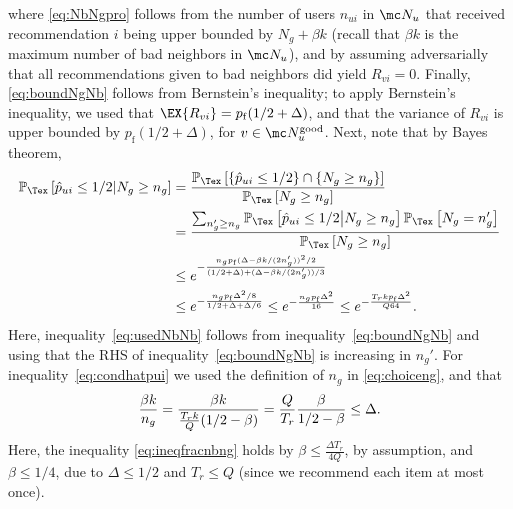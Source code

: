 \documentclass{article}
\newcommand\Comment[1]{\framebox[0.5\textwidth]{ \parbox{0.5\textwidth}{#1}  } \par}
\newcommand\pf{p_{\mathrm{f}}}
\newcommand\ocrating{R}
\newcommand\ocR{R}
\renewcommand\PR[2][\Tex]{
\ifthenelse{\equal{#1}{}}{{\mathbb P}\left[#2\right]}{\ensuremath{{\mathbb P}_{#1}\left[ #2\right]}}}
\begin{document}
where \eqref{eq:NbNgpro} follows from the number of users $n_{ui}$ in $\mc N_u$ that received recommendation $i$ being upper bounded by $N_g + \beta k$ (recall that $\beta k$ is the maximum number of bad neighbors in $\mc N_u$), 
and by assuming adversarially that all recommendations given to bad neighbors 
did yield $\ocR_{vi} = 0$. 
Finally, \eqref{eq:boundNgNb} follows from Bernstein's inequality; 
to apply Bernstein's inequality, we used that $\EX{\ocR_{vi}} = \pf (1/2 + \Delta)$, and that the variance of $\ocR_{vi}$ is upper bounded by $\pf (1/2 + \Delta)$, for $v\in \mc N_u^{\text{good}}$.  
%
%
Next, note that by Bayes theorem,
\begin{align}
\PR{\hat p_{ui} \leq 1/2 | N_g \geq n_g }
&=
\frac{\PR{ \{ \hat p_{ui} \leq 1/2 \} \cap \{ N_g \geq n_g \}  } }{
\PR{N_g \geq n_g }
} \nonumber \\
%
&= 
\frac{
\sum_{n_g' \geq n_g} 
\PR{\hat p_{ui} \leq 1/2  \big| N_g \geq n_g }
\PR{ N_g = n_g' }
}{
\PR{N_g \geq n_g }
} \nonumber \\
%
&\leq 
e^{ -  \frac{  n_g \pf  (\Delta - \nb/ (2n_g') )^2 / 2 }{  (1/2 + \Delta)  +  (\Delta - \nb/(2n_g'))/3  } } \label{eq:usedNbNb}\\
%
&\leq 
e^{ -  \frac{  n_g \pf  \Delta^2 / 8 }{  1/2 + \Delta + \Delta/6  } } 
\leq 
e^{ -  \frac{  n_g \pf  \Delta^2 }{  16  } } 
\leq 
e^{ -  \frac{  T_r k  \pf  \Delta^2 }{ Q 64  } }.
\label{eq:condhatpui}
\end{align}
Here, inequality~\eqref{eq:usedNbNb} follows from inequality~\eqref{eq:boundNgNb} and using that the RHS of inequality~\eqref{eq:boundNgNb} is increasing in $n_g'$. 
For inequality~\eqref{eq:condhatpui} we used the definition of $n_g$ in \eqref{eq:choiceng}, and that 
\begin{align}
\frac{\beta k}{n_g} 
=
\frac{\beta k}{ \frac{T_r k}{Q} (1/2- \beta) }
=
\frac{Q}{T_r } 
\frac{\beta }{ 1/2 - \beta } \leq \Delta.
\label{eq:ineqfracnbng}
\end{align}
Here, the inequality \eqref{eq:ineqfracnbng} holds by $\beta \leq \frac{\Delta T_r}{4Q}$, by assumption, and $\beta \leq 1/4$, due to $\Delta \leq 1/2$ and $T_r \leq Q$ (since we recommend each item at most once). 
\end{document}
